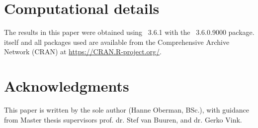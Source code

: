 \documentclass[article]{jss}
\begin{document}

% 




\section*{Computational details}


The results in this paper were obtained using ~3.6.1 with the ~3.6.0.9000 package.  itself and all packages used are available from the Comprehensive  Archive Network (CRAN) at \url{https://CRAN.R-project.org/}.


\section*{Acknowledgments}


This paper is written by the sole author (Hanne Oberman, BSc.), with guidance from Master thesis supervisors prof. dr. Stef van Buuren, and dr. Gerko Vink.
\end{document}
